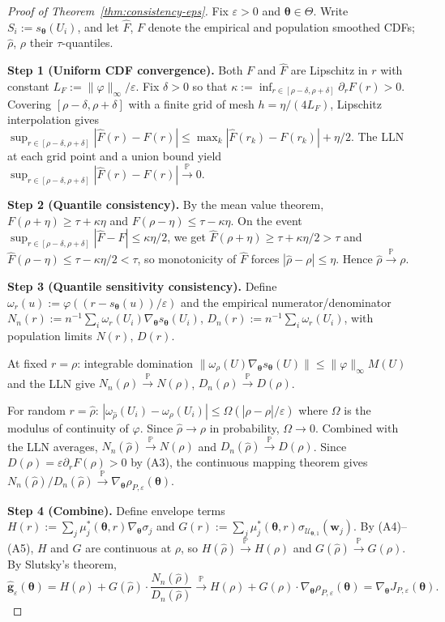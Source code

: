 \documentclass[11pt]{article}
\newcommand{\Prob}{\mathbb{P}}
\newcommand{\cU}{\mathcal{U}}
\newcommand{\btheta}{\bm{\theta}}
\newcommand{\bw}{\bm{w}}
\newcommand{\bg}{\bm{g}}
\theoremstyle{definition}
\begin{document}
\begin{proof}[Proof of Theorem~\ref{thm:consistency-eps}]
Fix $\varepsilon>0$ and $\btheta\in\Theta$. Write $S_i:=s_{\btheta}(U_i)$, and let $\hat F$, $F$ denote the empirical and population smoothed CDFs; $\hat\rho$, $\rho$ their $\tau$-quantiles.

\textbf{Step 1 (Uniform CDF convergence).}
Both $F$ and $\hat{F}$ are Lipschitz in $r$ with constant $L_F:=\|\varphi\|_\infty/\varepsilon$. Fix $\delta>0$ so that $\kappa:=\inf_{r\in[\rho-\delta,\rho+\delta]}\partial_rF(r)>0$. Covering $[\rho-\delta,\rho+\delta]$ with a finite grid of mesh $h=\eta/(4L_F)$, Lipschitz interpolation gives $\sup_{r\in[\rho-\delta,\rho+\delta]}|\hat{F}(r)-F(r)|\le\max_k|\hat{F}(r_k)-F(r_k)|+\eta/2$. The LLN at each grid point and a union bound yield $\sup_{r\in[\rho-\delta,\rho+\delta]}|\hat{F}(r)-F(r)|\xrightarrow{\Prob}0$.

\textbf{Step 2 (Quantile consistency).}
By the mean value theorem, $F(\rho+\eta)\ge\tau+\kappa\eta$ and $F(\rho-\eta)\le\tau-\kappa\eta$. On the event $\sup_{r\in[\rho-\delta,\rho+\delta]}|\hat{F}-F|\le\kappa\eta/2$, we get $\hat{F}(\rho+\eta)\ge\tau+\kappa\eta/2>\tau$ and $\hat{F}(\rho-\eta)\le\tau-\kappa\eta/2<\tau$, so monotonicity of $\hat{F}$ forces $|\hat\rho-\rho|\le\eta$. Hence $\hat\rho\xrightarrow{\Prob}\rho$.

\textbf{Step 3 (Quantile sensitivity consistency).}
Define $\omega_r(u):=\varphi((r-s_{\btheta}(u))/\varepsilon)$ and the empirical numerator/denominator $N_n(r):=n^{-1}\sum_i\omega_r(U_i)\nabla_{\btheta} s_{\btheta}(U_i)$, $D_n(r):=n^{-1}\sum_i\omega_r(U_i)$, with population limits $N(r)$, $D(r)$.

At fixed $r=\rho$: integrable domination $\|\omega_{\rho}(U)\nabla_{\btheta} s_{\btheta}(U)\|\le\|\varphi\|_\infty M(U)$ and the LLN give $N_n(\rho)\xrightarrow{\Prob}N(\rho)$, $D_n(\rho)\xrightarrow{\Prob}D(\rho)$.

For random $r=\hat{\rho}$: $|\omega_{\hat{\rho}}(U_i)-\omega_{\rho}(U_i)|\le\Omega(|\hat{\rho}-\rho|/\varepsilon)$ where $\Omega$ is the modulus of continuity of $\varphi$. Since $\hat{\rho}\to\rho$ in probability, $\Omega\to 0$. Combined with the LLN averages, $N_n(\hat{\rho})\xrightarrow{\Prob}N(\rho)$ and $D_n(\hat{\rho})\xrightarrow{\Prob}D(\rho)$. Since $D(\rho)=\varepsilon\partial_rF(\rho)>0$ by (A3), the continuous mapping theorem gives $N_n(\hat{\rho})/D_n(\hat{\rho})\xrightarrow{\Prob}\nabla_{\btheta}\rho_{P,\varepsilon}(\btheta)$.

\textbf{Step 4 (Combine).}
Define envelope terms \\ $H(r):=\sum_j\mu_j^*(\btheta,r)\nabla_{\btheta}\sigma_j$ and $G(r):=\sum_j\mu_j^*(\btheta,r)\sigma_{\cU_{\btheta,1}}(\bw_j)$. By (A4)--(A5), $H$ and $G$ are continuous at $\rho$, so $H(\hat{\rho})\xrightarrow{\Prob}H(\rho)$ and $G(\hat{\rho})\xrightarrow{\Prob}G(\rho)$. By Slutsky's theorem,
\[
\hat{\bg}_\varepsilon(\btheta) = H(\hat{\rho})+G(\hat{\rho})\cdot\frac{N_n(\hat{\rho})}{D_n(\hat{\rho})} \xrightarrow{\Prob} H(\rho)+G(\rho)\cdot\nabla_{\btheta}\rho_{P,\varepsilon}(\btheta) = \nabla_{\btheta} J_{P,\varepsilon}(\btheta).
\]
\end{proof}
\end{document}
